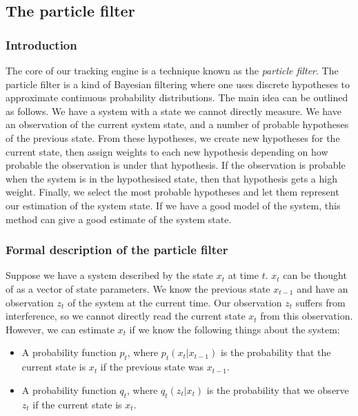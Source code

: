 \newcommand{\xmtN}[4]{
  \left\{#1_{#2}^{#3}\right\}_{#2=1}^{#4}
}
\newcommand{\interval}[2]{
  \left[#1, #2\right]
}

\subsection{The particle filter}
\subsubsection{Introduction}
The core of our tracking engine is a technique known as the \emph{particle filter}. The particle filter is a kind of Bayesian filtering where one uses discrete hypotheses to approximate continuous probability distributions. The main idea can be outlined as follows. We have a system with a state we cannot directly measure. We have an observation of the current system state, and a number of probable hypotheses of the previous state. From these hypotheses, we create new hypotheses for the current state, then assign weights to each new hypothesis depending on how probable the observation is under that hypothesis. If the observation is probable when the system is in the hypothesised state, then that hypothesis gets a high weight. Finally, we select the most probable hypotheses and let them represent our estimation of the system state. If we have a good model of the system, this method can give a good estimate of the system state.



\subsubsection{Formal description of the particle filter}
Suppose we have a system described by the state $x_t$ at time $t$. $x_t$ can be thought of as a vector of state parameters. We know the previous state $x_{t-1}$ and have an observation $z_t$ of the system at the current time. Our observation $z_t$ suffers from interference, so we cannot directly read the current state $x_t$ from this observation. However, we can estimate $x_t$ if we know the following things about the system:

\begin{itemize}
\item A probability function $p_t$, where $p_t\left(x_t | x_{t-1}\right)$ is the probability that the current state is $x_t$ if the previous state was $x_{t-1}$.
\item A probability function $q_t$, where $q_t\left(z_t | x_t\right)$ is the probability that we observe $z_t$ if the current state is $x_t$.
\end{itemize}

